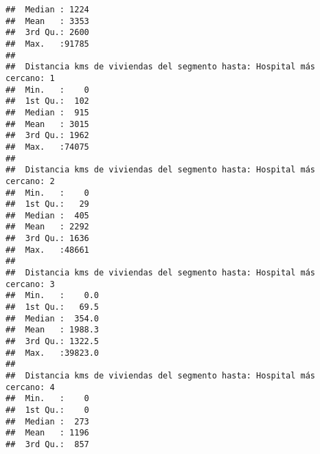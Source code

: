 \documentclass[11pt,]{article}
\begin{document}
\begin{verbatim}
##  Median : 1224                                                         
##  Mean   : 3353                                                         
##  3rd Qu.: 2600                                                         
##  Max.   :91785                                                         
##                                                                        
##  Distancia kms de viviendas del segmento hasta: Hospital más cercano: 1
##  Min.   :    0                                                         
##  1st Qu.:  102                                                         
##  Median :  915                                                         
##  Mean   : 3015                                                         
##  3rd Qu.: 1962                                                         
##  Max.   :74075                                                         
##                                                                        
##  Distancia kms de viviendas del segmento hasta: Hospital más cercano: 2
##  Min.   :    0                                                         
##  1st Qu.:   29                                                         
##  Median :  405                                                         
##  Mean   : 2292                                                         
##  3rd Qu.: 1636                                                         
##  Max.   :48661                                                         
##                                                                        
##  Distancia kms de viviendas del segmento hasta: Hospital más cercano: 3
##  Min.   :    0.0                                                       
##  1st Qu.:   69.5                                                       
##  Median :  354.0                                                       
##  Mean   : 1988.3                                                       
##  3rd Qu.: 1322.5                                                       
##  Max.   :39823.0                                                       
##                                                                        
##  Distancia kms de viviendas del segmento hasta: Hospital más cercano: 4
##  Min.   :    0                                                         
##  1st Qu.:    0                                                         
##  Median :  273                                                         
##  Mean   : 1196                                                         
##  3rd Qu.:  857                                                         

\end{verbatim}
\end{document}
